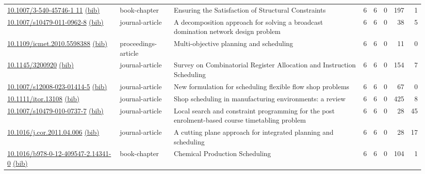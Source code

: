 {\begin{longtable}{p{5cm}lp{11cm}rrrrr}
\href{http://dx.doi.org/10.1007/3-540-45746-1_11}{10.1007/3-540-45746-1 11} \href{https://www.doi2bib.org/bib/10.1007/3-540-45746-1_11}{(bib)} & book-chapter & Ensuring the Satisfaction of Structural Constraints & 6 & 6 & 0 & 197 & 1 \\
\href{http://dx.doi.org/10.1007/s10479-011-0962-8}{10.1007/s10479-011-0962-8} \href{https://www.doi2bib.org/bib/10.1007/s10479-011-0962-8}{(bib)} & journal-article & A decomposition approach for solving a broadcast domination network design problem & 6 & 6 & 0 & 38 & 5 \\
\href{http://dx.doi.org/10.1109/icmet.2010.5598388}{10.1109/icmet.2010.5598388} \href{https://www.doi2bib.org/bib/10.1109/icmet.2010.5598388}{(bib)} & proceedings-article & Multi-objective planning and scheduling & 6 & 6 & 0 & 11 & 0 \\
\href{http://dx.doi.org/10.1145/3200920}{10.1145/3200920} \href{https://www.doi2bib.org/bib/10.1145/3200920}{(bib)} & journal-article & Survey on Combinatorial Register Allocation and Instruction Scheduling & 6 & 6 & 0 & 154 & 7 \\
\href{http://dx.doi.org/10.1007/s12008-023-01414-5}{10.1007/s12008-023-01414-5} \href{https://www.doi2bib.org/bib/10.1007/s12008-023-01414-5}{(bib)} & journal-article & New formulation for scheduling flexible flow shop problems & 6 & 6 & 0 & 67 & 0 \\
\href{http://dx.doi.org/10.1111/itor.13108}{10.1111/itor.13108} \href{https://www.doi2bib.org/bib/10.1111/itor.13108}{(bib)} & journal-article & Shop scheduling in manufacturing environments: a review & 6 & 6 & 0 & 425 & 8 \\
\href{http://dx.doi.org/10.1007/s10479-010-0737-7}{10.1007/s10479-010-0737-7} \href{https://www.doi2bib.org/bib/10.1007/s10479-010-0737-7}{(bib)} & journal-article & Local search and constraint programming for the post enrolment-based course timetabling problem & 6 & 6 & 0 & 28 & 45 \\
\href{http://dx.doi.org/10.1016/j.cor.2011.04.006}{10.1016/j.cor.2011.04.006} \href{https://www.doi2bib.org/bib/10.1016/j.cor.2011.04.006}{(bib)} & journal-article & A cutting plane approach for integrated planning and scheduling & 6 & 6 & 0 & 28 & 17 \\
\href{http://dx.doi.org/10.1016/b978-0-12-409547-2.14341-0}{10.1016/b978-0-12-409547-2.14341-0} \href{https://www.doi2bib.org/bib/10.1016/b978-0-12-409547-2.14341-0}{(bib)} & book-chapter & Chemical Production Scheduling & 6 & 6 & 0 & 104 & 1 \\

\end{longtable}}
